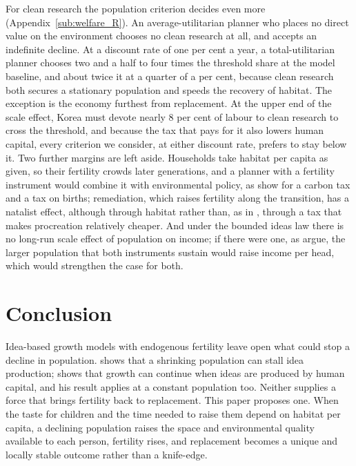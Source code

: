 \documentclass[11pt]{article}
\begin{document}
For clean research the population criterion decides even more (Appendix~\ref{sub:welfare_R}). An
average-utilitarian planner who places no direct value on the environment chooses no clean research at
all, and accepts an indefinite decline. At a discount rate of one per cent a year, a total-utilitarian planner chooses two and a half to four
times the threshold share at the model baseline, and about twice it at a quarter of a per cent, because clean research both secures a stationary population and speeds the
recovery of habitat. The exception is the economy furthest from replacement. At the upper end of the
scale effect, Korea must devote nearly 8 per cent of labour to clean research to cross the threshold, and
because the tax that pays for it also lowers human capital, every criterion we consider, at either discount rate,
prefers to stay below it. Two further margins are left aside. Households take habitat per capita as given, so their fertility crowds
later generations, and a planner with a fertility instrument would combine it with environmental policy,
as \citet{gerlagh2023} show for a carbon tax and a tax on births; remediation, which raises
fertility along the transition, has a natalist effect, although through habitat rather than, as in
\citet{DELACROIX2012271}, through a tax that makes procreation relatively cheaper. And
under the bounded ideas law there is no long-run scale effect of population on income; if there were one,
as \citet{edenkuruc2026} argue, the larger population that both instruments sustain would raise income per
head, which would strengthen the case for both.

\section{Conclusion}
\label{sec:conclusion}

Idea-based growth models with endogenous fertility leave open what could stop a decline in population.
\citet{jones22} shows that a shrinking population can stall idea production; \citet{STRULIK2024104943}
shows that growth can continue when ideas are produced by human capital, and his result applies at a
constant population too. Neither supplies a force that brings fertility back to replacement. This paper
proposes one. When the taste for children and the time needed to raise them depend on habitat per capita,
a declining population raises the space and environmental quality available to each person, fertility
rises, and replacement becomes a unique and locally stable outcome rather than a knife-edge.
\end{document}
